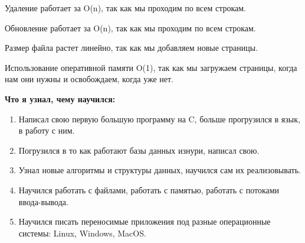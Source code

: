\documentclass[12pt,onecolumn]{article}
\begin{document}
Удаление работает за O(n), так как мы проходим по всем строкам.

Обновление работает за O(n), так как мы проходим по всем строкам.

Размер файла растет линейно, так как мы добавляем новые страницы.

Использование оперативной памяти O(1), так как мы загружаем страницы, когда нам они нужны и освобождаем, когда уже нет.

\textbf{Что я узнал, чему научился:}
\begin{enumerate}
  \item Написал свою первую большую программу на C, больше прогрузился в язык, в работу с ним.
  \item Погрузился в то как работают базы данных изнури, написал свою.
  \item Узнал новые алгоритмы и структуры данных, научился сам их реализовывать.
  \item Научился работать с файлами, работать с памятью, работать с потоками ввода-вывода.
  \item Научился писать переносимые приложения под разные операционные системы: Linux, Windows, MacOS.
\end{enumerate}
\end{document}
